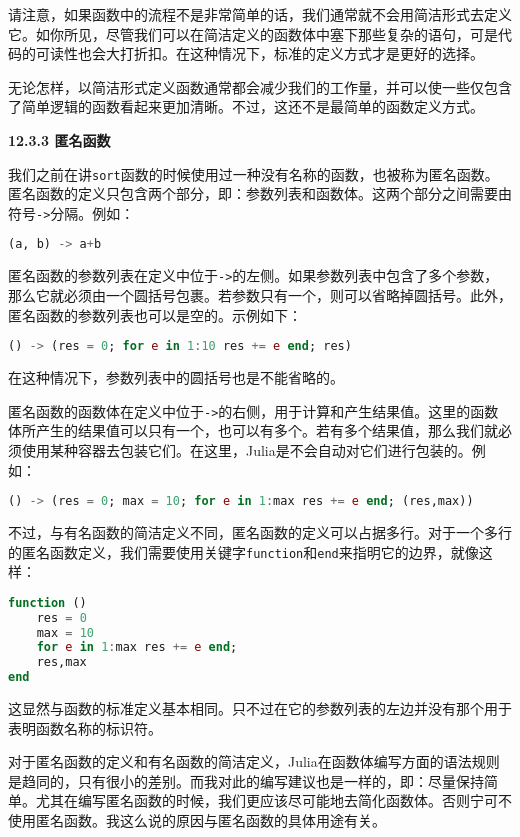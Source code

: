 请注意，如果函数中的流程不是非常简单的话，我们通常就不会用简洁形式去定义它。如你所见，尽管我们可以在简洁定义的函数体中塞下那些复杂的语句，可是代码的可读性也会大打折扣。在这种情况下，标准的定义方式才是更好的选择。

无论怎样，以简洁形式定义函数通常都会减少我们的工作量，并可以使一些仅包含了简单逻辑的函数看起来更加清晰。不过，这还不是最简单的函数定义方式。

\textbf{12.3.3 匿名函数}

我们之前在讲\verb|sort|函数的时候使用过一种没有名称的函数，也被称为匿名函数。匿名函数的定义只包含两个部分，即：参数列表和函数体。这两个部分之间需要由符号\verb|->|分隔。例如：

\begin{lstlisting}[language=julia]
(a, b) -> a+b
\end{lstlisting}

匿名函数的参数列表在定义中位于\verb|->|的左侧。如果参数列表中包含了多个参数，那么它就必须由一个圆括号包裹。若参数只有一个，则可以省略掉圆括号。此外，匿名函数的参数列表也可以是空的。示例如下：

\begin{lstlisting}[language=julia]
() -> (res = 0; for e in 1:10 res += e end; res)
\end{lstlisting}

在这种情况下，参数列表中的圆括号也是不能省略的。

匿名函数的函数体在定义中位于\verb|->|的右侧，用于计算和产生结果值。这里的函数体所产生的结果值可以只有一个，也可以有多个。若有多个结果值，那么我们就必须使用某种容器去包装它们。在这里，Julia是不会自动对它们进行包装的。例如：

\begin{lstlisting}[language=julia]
() -> (res = 0; max = 10; for e in 1:max res += e end; (res,max))
\end{lstlisting}

不过，与有名函数的简洁定义不同，匿名函数的定义可以占据多行。对于一个多行的匿名函数定义，我们需要使用关键字\verb|function|和\verb|end|来指明它的边界，就像这样：

\begin{lstlisting}[language=julia]
function ()
    res = 0
    max = 10
    for e in 1:max res += e end;
    res,max
end
\end{lstlisting}

这显然与函数的标准定义基本相同。只不过在它的参数列表的左边并没有那个用于表明函数名称的标识符。

对于匿名函数的定义和有名函数的简洁定义，Julia在函数体编写方面的语法规则是趋同的，只有很小的差别。而我对此的编写建议也是一样的，即：尽量保持简单。尤其在编写匿名函数的时候，我们更应该尽可能地去简化函数体。否则宁可不使用匿名函数。我这么说的原因与匿名函数的具体用途有关。

